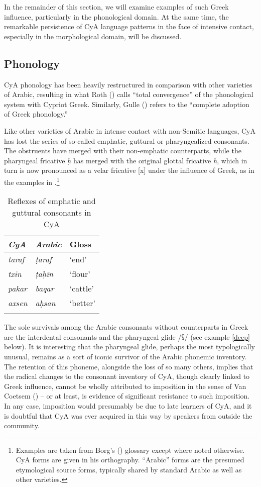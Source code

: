 \documentclass[output=paper]{langsci/langscibook}
\begin{document}
In the remainder of this section, we will examine examples of such Greek influence, particularly in the phonological domain. At the same time, the remarkable persistence of CyA language patterns in the face of intensive contact, especially in the morphological domain, will be discussed.

\subsection{Phonology}

CyA phonology has been heavily restructured in comparison with other varieties of Arabic, resulting in what Roth (\citeyear[55]{Roth2004}) calls “total convergence” of the phonological system with Cypriot Greek. Similarly, Gulle (\citeyear[47]{Gulle2016}) refers to the “complete adoption of Greek phonology.” 

Like other varieties of Arabic in intense contact with non-Semitic languages, CyA has lost the series of so-called emphatic, guttural or pharyngealized consonants. The obstruents have merged with their non-emphatic counterparts, while the pharyngeal fricative \textit{ḥ} has merged with the original glottal fricative \textit{h}, which in turn is now pronounced as a velar fricative [x] under the influence of Greek, as in the examples in .\footnote{Examples are taken from Borg's (\citeyear{Borg2004}) glossary except where noted otherwise. CyA forms are given in his orthography. “Arabic” forms are the presumed etymological source forms, typically shared by standard Arabic as well as other varieties.}  

\begin{table}
\begin{tabular}{>{\itshape}l>{\itshape}ll}
\lsptoprule
{\normalfont CyA} & {\normalfont Arabic} & {Gloss}\\\midrule
taraf & ṭaraf & ‘end’\\
txin & ṭaḥīn & ‘flour’\\
pakar & baqar & ‘cattle’\\
axsen & aḥsan & ‘better’\\
\lspbottomrule
\end{tabular}
\caption{\label{bkm:Ref13774757}Reflexes of emphatic and guttural consonants in CyA\label{tab:walter:1}}
\end{table}

The sole survivals among the Arabic consonants without counterparts in Greek are the interdental consonants and the pharyngeal glide /ʕ/ (see example \ref{deep} below). It is interesting that the pharyngeal glide, perhaps the most typologically unusual, remains as a sort of iconic survivor of the Arabic phonemic inventory. The retention of this phoneme, alongside the loss of so many others, implies that the radical changes to the consonant inventory of CyA, though clearly linked to Greek influence, cannot be wholly attributed to imposition in the sense of Van Coetsem (\citeyear{VanCoetsem1988,VanCoetsem2000}) – or at least, is evidence of significant resistance to such imposition. In any case, imposition would presumably be due to late learners of CyA, and it is doubtful that CyA was ever acquired in this way by speakers from outside the community.
\end{document}

